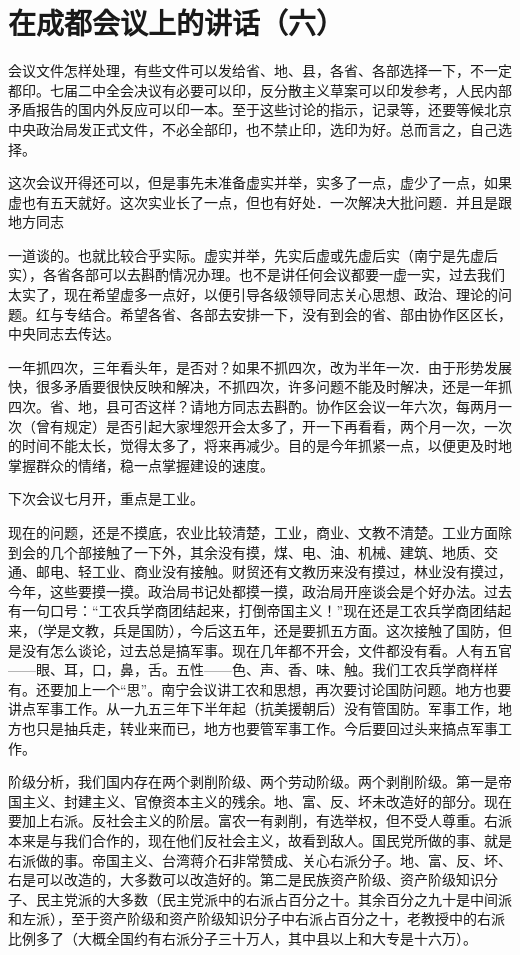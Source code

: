 \section[在成都会议上的讲话（六）（一九五八年三月二十六日）]{在成都会议上的讲话（六）}


会议文件怎样处理，有些文件可以发给省、地、县，各省、各部选择一下，不一定都印。七届二中全会决议有必要可以印，反分散主义草案可以印发参考，人民内部矛盾报告的国内外反应可以印一本。至于这些讨论的指示，记录等，还要等候北京中央政治局发正式文件，不必全部印，也不禁止印，选印为好。总而言之，自己选择。

这次会议开得还可以，但是事先未准备虚实并举，实多了一点，虚少了一点，如果虚也有五天就好。这次实业长了一点，但也有好处．一次解决大批问题．并且是跟地方同志

一道谈的。也就比较合乎实际。虚实并举，先实后虚或先虚后实（南宁是先虚后实），各省各部可以去斟酌情况办理。也不是讲任何会议都要一虚一实，过去我们太实了，现在希望虚多一点好，以便引导各级领导同志关心思想、政治、理论的问题。红与专结合。希望各省、各部去安排一下，没有到会的省、部由协作区区长，中央同志去传达。

一年抓四次，三年看头年，是否对？如果不抓四次，改为半年一次．由于形势发展快，很多矛盾要很快反映和解决，不抓四次，许多问题不能及时解决，还是一年抓四次。省、地，县可否这样？请地方同志去斟酌。协作区会议一年六次，每两月一次（曾有规定）是否引起大家埋怨开会太多了，开一下再看看，两个月一次，一次的时间不能太长，觉得太多了，将来再减少。目的是今年抓紧一点，以便更及时地掌握群众的情绪，稳一点掌握建设的速度。

下次会议七月开，重点是工业。

现在的问题，还是不摸底，农业比较清楚，工业，商业、文教不清楚。工业方面除到会的几个部接触了一下外，其余没有摸，煤、电、油、机械、建筑、地质、交通、邮电、轻工业、商业没有接触。财贸还有文教历来没有摸过，林业没有摸过，今年，这些要摸一摸。政治局书记处都摸一摸，政治局开座谈会是个好办法。过去有一句口号：“工农兵学商团结起来，打倒帝国主义！”现在还是工农兵学商团结起来，（学是文教，兵是国防），今后这五年，还是要抓五方面。这次接触了国防，但是没有怎么谈论，过去总是搞军事。现在几年都不开会，文件都没有看。人有五官——眼、耳，口，鼻，舌。五性——色、声、香、味、触。我们工农兵学商样样有。还要加上一个“思”。南宁会议讲工农和思想，再次要讨论国防问题。地方也要讲点军事工作。从一九五三年下半年起（抗美援朝后）没有管国防。军事工作，地方也只是抽兵走，转业来而已，地方也要管军事工作。今后要回过头来搞点军事工作。

阶级分析，我们国内存在两个剥削阶级、两个劳动阶级。两个剥削阶级。第一是帝国主义、封建主义、官僚资本主义的残余。地、富、反、坏未改造好的部分。现在要加上右派。反社会主义的阶层。富农一有剥削，有选举权，但不受人尊重。右派本来是与我们合作的，现在他们反社会主义，故看到敌人。国民党所做的事、就是右派做的事。帝国主义、台湾蒋介石非常赞成、关心右派分子。地、富、反、坏、右是可以改造的，大多数可以改造好的。第二是民族资产阶级、资产阶级知识分子、民主党派的大多数（民主党派中的右派占百分之十。其余百分之九十是中间派和左派），至于资产阶级和资产阶级知识分子中右派占百分之十，老教授中的右派比例多了（大概全国约有右派分子三十万人，其中县以上和大专是十六万）。

